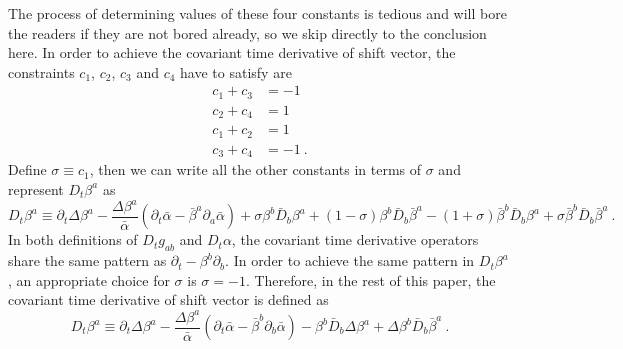The process of determining values of these four constants is tedious and will bore the readers if they are not bored already, so we skip directly to the conclusion here. In order to achieve the covariant time derivative of shift vector, the constraints $c_{1}$, $c_{2}$, $c_{3}$ and $c_{4}$ have to satisfy are
\begin{align*}
c_{1} + c_{3} & = -1\\
c_{2} + c_{4} & = 1\\
c_{1} + c_{2} & = 1\\
c_{3} + c_{4} & = -1 \ .
\end{align*}
Define $\sigma \equiv c_{1}$, then we can write all the other constants in terms of $\sigma$ and represent $D_{t}\beta^{a}$ as
\begin{equation}
	D_{t}\beta^{a} \equiv \partial_{t}\Delta \beta^{a} - \frac{\Delta \beta^{a}}{{\bar \alpha}}\left(\partial_{t}{\bar \alpha} - {\bar \beta}^{a}\partial_{a}{\bar \alpha}\right) + \sigma\beta^{b}{\bar D}_{b}\beta^{a} + \left(1-\sigma\right)\beta^{b}{\bar D}_{b}{\bar \beta}^{a} - \left(1 + \sigma\right){\bar \beta}^{b}{\bar D}_{b}\beta^{a} + \sigma{\bar \beta}^{b}{\bar D}_{b}{\bar \beta}^{a} \ .
\end{equation}
In both definitions of $D_{t}g_{ab}$ and $D_{t}\alpha$, the covariant time derivative operators share the same pattern as $\partial_{t} - \beta^{b}\partial_{b}$. In order to achieve the same pattern in $D_{t}\beta^{a}$, an appropriate choice for $\sigma$ is $\sigma = -1$. Therefore, in the rest of this paper, the covariant time derivative of shift vector is defined as
\begin{equation}\label{shiftcovarianttimederivative}
	D_{t}\beta^{a} \equiv \partial_{t}\Delta \beta^{a} - \frac{\Delta \beta^{a}}{{\bar \alpha}}\left(\partial_{t}{\bar \alpha} - {\bar \beta}^{b}\partial_{b}{\bar \alpha}\right) - \beta^{b}{\bar D}_{b}\Delta \beta^{a} + \Delta \beta^{b}{\bar D}_{b}{\bar \beta}^{a} \ .	
\end{equation}

